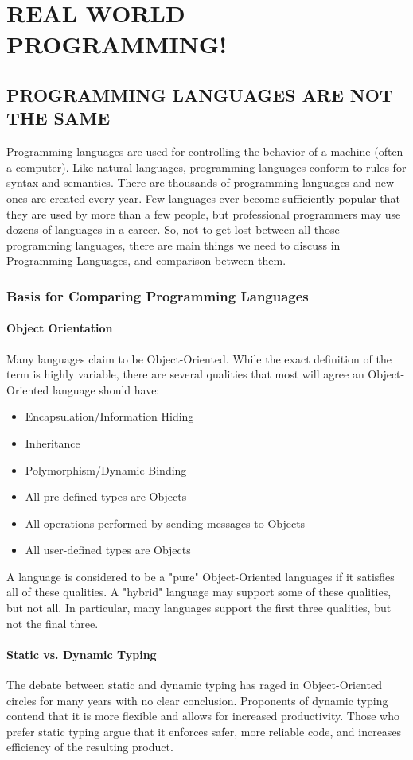 \documentclass[12pt,a4paper,final,twoside,titlepage]{book}
\begin{document}
\part{REAL WORLD PROGRAMMING!}
\chapter{PROGRAMMING LANGUAGES ARE NOT THE SAME}
Programming languages are used for controlling the behavior of a machine (often a computer). Like natural languages, programming languages conform to rules for syntax and semantics. There are thousands of programming languages and new ones are created every year. Few languages ever become sufficiently popular that they are used by more than a few people, but professional programmers may use dozens of languages in a career. So, not to get lost between all those programming languages, there are main things we need to discuss in Programming Languages, and comparison between them.
\section{Basis for Comparing Programming Languages}
\subsection{Object Orientation}
Many languages claim to be Object-Oriented. While the exact definition of the term is highly variable, there are several qualities that most will agree an Object-Oriented language should have:
\begin{itemize}
\item Encapsulation/Information Hiding
\item Inheritance
\item Polymorphism/Dynamic Binding
\item All pre-defined types are Objects
\item All operations performed by sending messages to Objects
\item All user-defined types are Objects
\end{itemize}
A language is considered to be a "pure" Object-Oriented languages if it satisfies all of these qualities. A "hybrid" language may support some of these qualities, but not all. In particular, many languages support the first three qualities, but not the final three.

\subsection{Static vs. Dynamic Typing}
The debate between static and dynamic typing has raged in Object-Oriented circles for many years with no clear conclusion. Proponents of dynamic typing contend that it is more flexible and allows for increased productivity. Those who prefer static typing argue that it enforces safer, more reliable code, and increases efficiency of the resulting product.
\end{document}
